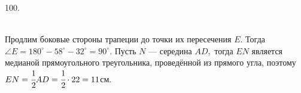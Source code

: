 100. \begin{figure}[ht!]
\end{figure}\\
Продлим боковые стороны трапеции до точки их пересечения $E.$ Тогда $\angle E=180^\circ-58^\circ-32^\circ=90^\circ.$ Пусть $N$ --- середина $AD,$ тогда $EN$ является медианой прямоугольного треугольника, проведённой из прямого угла, поэтому $EN=\cfrac{1}{2}AD=\cfrac{1}{2}\cdot22=11$см.\newpage\noindent
